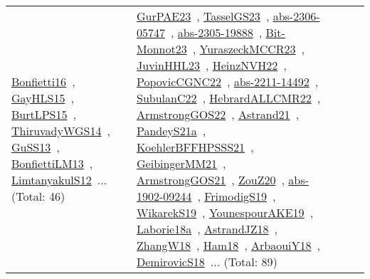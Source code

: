 {\begin{longtable}{lp{3cm}>{\raggedright\arraybackslash}p{6cm}>{\raggedright\arraybackslash}p{6cm}>{\raggedright\arraybackslash}p{8cm}}
\href{works/Bonfietti16.pdf}{Bonfietti16}~\cite{Bonfietti16}, \href{works/GayHLS15.pdf}{GayHLS15}~\cite{GayHLS15}, \href{works/BurtLPS15.pdf}{BurtLPS15}~\cite{BurtLPS15}, \href{works/ThiruvadyWGS14.pdf}{ThiruvadyWGS14}~\cite{ThiruvadyWGS14}, \href{works/GuSS13.pdf}{GuSS13}~\cite{GuSS13}, \href{works/BonfiettiLM13.pdf}{BonfiettiLM13}~\cite{BonfiettiLM13}, \href{works/LimtanyakulS12.pdf}{LimtanyakulS12}~\cite{LimtanyakulS12}... (Total: 46) & \href{works/GurPAE23.pdf}{GurPAE23}~\cite{GurPAE23}, \href{works/TasselGS23.pdf}{TasselGS23}~\cite{TasselGS23}, \href{works/abs-2306-05747.pdf}{abs-2306-05747}~\cite{abs-2306-05747}, \href{works/abs-2305-19888.pdf}{abs-2305-19888}~\cite{abs-2305-19888}, \href{works/Bit-Monnot23.pdf}{Bit-Monnot23}~\cite{Bit-Monnot23}, \href{works/YuraszeckMCCR23.pdf}{YuraszeckMCCR23}~\cite{YuraszeckMCCR23}, \href{works/JuvinHHL23.pdf}{JuvinHHL23}~\cite{JuvinHHL23}, \href{works/HeinzNVH22.pdf}{HeinzNVH22}~\cite{HeinzNVH22}, \href{works/PopovicCGNC22.pdf}{PopovicCGNC22}~\cite{PopovicCGNC22}, \href{works/abs-2211-14492.pdf}{abs-2211-14492}~\cite{abs-2211-14492}, \href{works/SubulanC22.pdf}{SubulanC22}~\cite{SubulanC22}, \href{works/HebrardALLCMR22.pdf}{HebrardALLCMR22}~\cite{HebrardALLCMR22}, \href{works/ArmstrongGOS22.pdf}{ArmstrongGOS22}~\cite{ArmstrongGOS22}, \href{works/Astrand21.pdf}{Astrand21}~\cite{Astrand21}, \href{works/PandeyS21a.pdf}{PandeyS21a}~\cite{PandeyS21a}, \href{works/KoehlerBFFHPSSS21.pdf}{KoehlerBFFHPSSS21}~\cite{KoehlerBFFHPSSS21}, \href{works/GeibingerMM21.pdf}{GeibingerMM21}~\cite{GeibingerMM21}, \href{works/ArmstrongGOS21.pdf}{ArmstrongGOS21}~\cite{ArmstrongGOS21}, \href{works/ZouZ20.pdf}{ZouZ20}~\cite{ZouZ20}, \href{works/abs-1902-09244.pdf}{abs-1902-09244}~\cite{abs-1902-09244}, \href{works/FrimodigS19.pdf}{FrimodigS19}~\cite{FrimodigS19}, \href{works/WikarekS19.pdf}{WikarekS19}~\cite{WikarekS19}, \href{works/YounespourAKE19.pdf}{YounespourAKE19}~\cite{YounespourAKE19}, \href{works/Laborie18a.pdf}{Laborie18a}~\cite{Laborie18a}, \href{works/AstrandJZ18.pdf}{AstrandJZ18}~\cite{AstrandJZ18}, \href{works/ZhangW18.pdf}{ZhangW18}~\cite{ZhangW18}, \href{works/Ham18.pdf}{Ham18}~\cite{Ham18}, \href{works/ArbaouiY18.pdf}{ArbaouiY18}~\cite{ArbaouiY18}, \href{works/DemirovicS18.pdf}{DemirovicS18}~\cite{DemirovicS18}... (Total: 89)\\

\end{longtable}}
